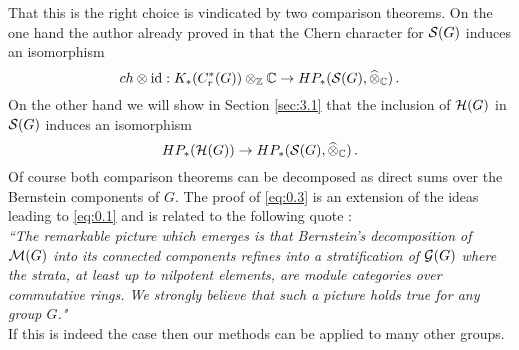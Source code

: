 That this is the right choice is vindicated by two comparison theorems. 
On the one hand the author already proved in \cite{Sol1} that the Chern character 
for $\mathcal S (G)$ induces an isomorphism
\begin{equation}\label{eq:0.2}
ch \otimes \mathrm{id} : K_* (C_r ^* (G)) \otimes_{\mathbb Z} \mathbb C \to HP_* (\mathcal S (G) ,\widehat{\otimes}_{\mathbb C}) \,.
\end{equation}
On the other hand we will show in Section \ref{sec:3.1} that the inclusion of $\mathcal H (G)$
in $\mathcal S (G)$ induces an isomorphism
\begin{equation}\label{eq:0.3}
HP_* (\mathcal H (G)) \to HP_* (\mathcal S (G) ,\widehat{\otimes}_{\mathbb C}) \,.
\end{equation}
Of course both comparison theorems can be decomposed as direct sums over the
Bernstein components of $G$. The proof of \eqref{eq:0.3} is an extension of the ideas 
leading to \eqref{eq:0.1} and is related to the following quote \cite[p. 3]{SSZ}:\\
\emph{``The remarkable picture which emerges is that Bernstein's decomposition of
$\mathcal M (G)$ into its connected components refines into a stratification of $\mathcal G (G)$ 
where the strata, at least up to nilpotent elements, are module categories over 
commutative rings. We strongly believe that such a picture holds true for any group $G$."}\\
If this is indeed the case then our methods can be applied to many other groups.
\\[1mm]

